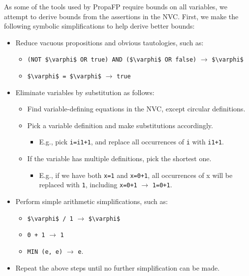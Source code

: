 \documentclass[runningheads]{llncs}
\begin{document}
As some of the tools used by PropaFP require bounds on all variables, we attempt to derive bounds from the assertions in the NVC.
First, we make the following symbolic simplifications to help derive better bounds:
\begin{itemize}
  \item Reduce vacuous propositions and obvious tautologies, such as:
  \begin{itemize}
    \item \lstinline{(NOT $\varphi$ OR true) AND ($\varphi$ OR false)} $\longrightarrow$ \lstinline{$\varphi$}
    \item \lstinline{$\varphi$ = $\varphi$} $\longrightarrow$ \lstinline{true}
  \end{itemize}
  \item Eliminate variables by substitution as follows: 
  \begin{itemize}
    \item Find variable-defining equations in the NVC, except  circular definitions.
    \item Pick a variable definition and make substitutions accordingly.
    \begin{itemize}
      \item E.g., pick \lstinline{i=i1+1}, and replace all occurrences of \lstinline{i} with \lstinline{i1+1}.
    \end{itemize} 
    \item If the variable has multiple definitions, pick the shortest one.
    \begin{itemize}
      \item E.g., if we have both \lstinline{x=1} and \lstinline {x=0+1}, all occurrences of x will be replaced with \lstinline{1}, including \lstinline{x=0+1} $\longrightarrow$ \lstinline{1=0+1}.
    \end{itemize}
  \end{itemize}
  \item Perform simple arithmetic simplifications, such as:
    \begin{itemize}
      \item \lstinline{$\varphi$ / 1} $\longrightarrow$ \lstinline{$\varphi$}
      \item \lstinline{0 + 1} $\longrightarrow$ \lstinline{1}
      \item \lstinline{MIN (e, e)} $\longrightarrow$ \lstinline{e}.
    \end{itemize}
  \item Repeat the above steps until no further simplification can be made.
\end{itemize}
\end{document}
